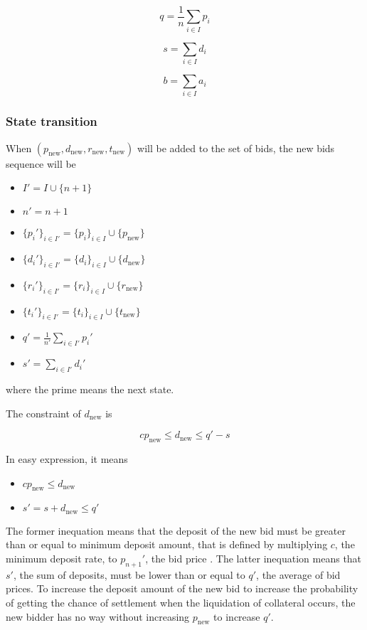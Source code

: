 \documentclass[dvipdfmx]{jsarticle}
\begin{document}
$$
  q = \frac{1}{n} \sum_{i \in I} p_i
$$

$$
  s = \sum_{i \in I} d_i
$$

$$
  b = \sum_{i \in I} a_i
$$

\subsubsection{State transition}

When $(p_{\text{new}}, d_{\text{new}}, r_{\text{new}}, t_{\text{new}})$ will be added to the set of bids, the new bids sequence will be

\begin{itemize}
  \item $I' = I \cup \{n+1\}$
  \item $n' = n + 1$
  \item $\{p_i'\}_{i \in I'} = \{p_i\}_{i \in I} \cup \{p_{\text{new}}\}$
  \item $\{d_i'\}_{i \in I'} = \{d_i\}_{i \in I} \cup \{d_{\text{new}}\}$
  \item $\{r_i'\}_{i \in I'} = \{r_i\}_{i \in I} \cup \{r_{\text{new}}\}$
  \item $\{t_i'\}_{i \in I'} = \{t_i\}_{i \in I} \cup \{t_{\text{new}}\}$
  \item $q' = \frac{1}{n'} \sum_{i \in I'} p_i'$
  \item $s' = \sum_{i \in I'} d_i'$
\end{itemize}

where the prime means the next state.

The constraint of $d_{\text{new}}$ is

$$
  c p_{\text{new}} \le d_{\text{new}} \le q' - s
$$

In easy expression, it means

\begin{itemize}
  \item $c p_{\text{new}} \le d_{\text{new}}$
  \item $s' = s + d_{\text{new}} \le q'$
\end{itemize}

The former inequation means that
the deposit of the new bid must be greater than or equal to minimum deposit amount,
that is defined by multiplying $c$, the minimum deposit rate, to $p_{n+1}'$, the bid price .
The latter inequation means that $s'$, the sum of deposits, must be lower than or equal to $q'$, the average of bid prices.
To increase the deposit amount of the new bid
to increase the probability of getting the chance of settlement when the liquidation of collateral occurs,
the new bidder has no way without increasing $p_{\text{new}}$ to increase $q'$.
\end{document}
